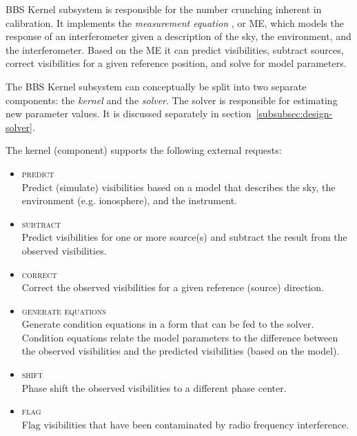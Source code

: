 \documentclass[10pt]{lofar}
\newcommand{\me}{ME\xspace}
\newcommand{\predict}{\textsc{predict}\xspace}
\newcommand{\subtract}{\textsc{subtract}\xspace}
\newcommand{\correct}{\textsc{correct}\xspace}
\newcommand{\generate}{\textsc{generate equations}\xspace}
\newcommand{\shift}{\textsc{shift}\xspace}
\newcommand{\flag}{\textsc{flag}\xspace}
\begin{document}


BBS Kernel subsystem is responsible for the number crunching inherent in
calibration. It implements the \emph{measurement equation} \cite{Hamaker1995,
aips++note185}, or \me, which models the response of an interferometer given a
description of the sky, the environment, and the interferometer. Based on the
\me it can predict visibilities, subtract sources, correct visibilities for a
given reference position, and solve for model parameters.

The BBS Kernel subsystem can conceptually be split into two separate components:
the \emph{kernel} and the \emph{solver}. The solver is responsible for
estimating new parameter values. It is discussed separately in
section~\ref{subsubsec:design-solver}.

The kernel (component) supports the following external requests:

\begin{itemize}
\item \predict\\
Predict (simulate) visibilities based on a model that describes the sky, the
environment (e.g. ionosphere), and the instrument.
\item \subtract\\
Predict visibilities for one or more source(s) and subtract the result from the
observed visibilities.
\item \correct\\
Correct the observed visibilities for a given reference (source) direction.
\item \generate\\
Generate condition equations in a form that can be fed to the solver. Condition
equations relate the model parameters to the difference between the observed
visibilities and the predicted visibilities (based on the model).
\item \shift\\
Phase shift the observed visibilities to a different phase center.
\item \flag\\
Flag visibilities that have been contaminated by radio frequency interference.
\end{itemize}
\end{document}
